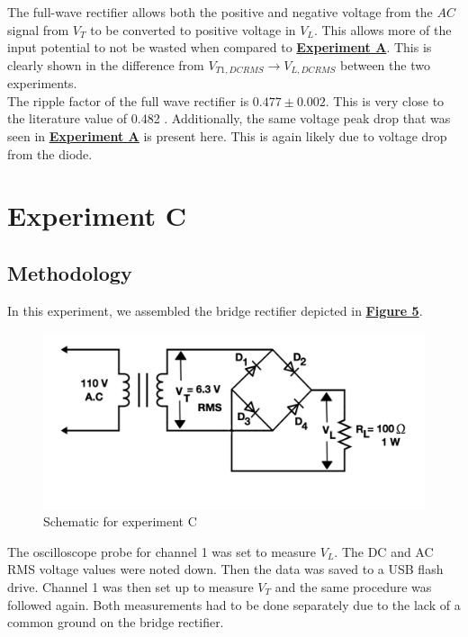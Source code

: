 \documentclass[
	letterpaper
	12pt
]{template}
\newcommand{\bref}[2]{\textbf{\hyperref[#1]{#2}}}
\begin{document}


The full-wave rectifier allows both the positive and negative voltage from the $AC$ signal from $V_T$ to be converted to positive voltage in $V_L$. This allows more of the input potential to not be wasted when compared to \bref{exp::A}{Experiment A}. This is clearly shown in the difference from $V_{T1,DCRMS} \rightarrow V_{L,DCRMS}$ between the two experiments.\\

The ripple factor of the full wave rectifier is $0.477\pm0.002$.
This is very close to the literature value of 0.482 \cite{Rashid_2006}. Additionally, the same voltage peak drop that was seen in \bref{exp::A}{Experiment A} is present here. This is again likely due to voltage drop from the diode.







\section{Experiment C}\label{exp::C}
\subsection{Methodology}\label{method::C}
In this experiment, we assembled the bridge rectifier depicted in \textbf{\hyperref[apparatus::C]{Figure 5}}.

\begin{figure}[H]\label{apparatus::C}
	\centering
	\begin{minipage}[c]{0.45\textwidth}
		\centering
		\includegraphics[width=\textwidth]{figures/C/schematic.png}
		\caption{Schematic for experiment C}
	\end{minipage}
\end{figure}

The oscilloscope probe for channel 1 was set to measure $V_L$. The DC and AC RMS voltage values were noted down. Then the data was saved to a USB flash drive. Channel 1 was then set up to measure $V_T$ and the same procedure was followed again. Both measurements had to be done separately due to the lack of a common ground on the bridge rectifier.
\end{document}
